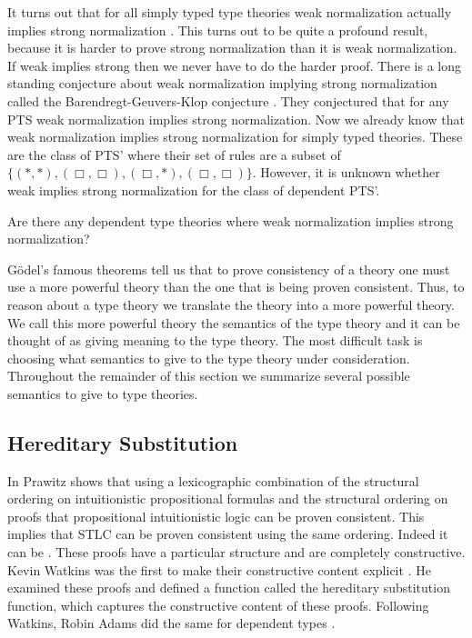 \documentclass{article}
\begin{document}
It turns out that for all simply typed type theories weak
normalization actually implies strong normalization
\cite{Sorensen:1997}.  This turns out to be quite a profound result,
because it is harder to prove strong normalization than it is weak
normalization.  If weak implies strong then we never have to do the
harder proof.  There is a long standing conjecture about weak
normalization implying strong normalization called the
Barendregt-Geuvers-Klop conjecture \cite{Sorensen:2006}.  They
conjectured that for any PTS weak normalization implies strong
normalization.  Now we already know that weak normalization implies
strong normalization for simply typed theories.  These are the class
of PTS' where their set of rules are a subset of
$\{(*,*),(\Box,\Box),(\Box,*),(\Box,\Box)\}$.  However, it is unknown
whether weak implies strong normalization for the class of dependent
PTS'.
\begin{openproblem}
  Are there any dependent type theories where weak normalization
  implies strong normalization?
\end{openproblem}

G\"odel's famous theorems tell us that to prove consistency of a
theory one must use a more powerful theory than the one that is being
proven consistent.  Thus, to reason about a type theory we translate
the theory into a more powerful theory.  We call this more powerful
theory the semantics of the type theory and it can be thought of as
giving meaning to the type theory.  The most difficult task is
choosing what semantics to give to the type theory under
consideration.  Throughout the remainder of this section we summarize
several possible semantics to give to type theories.  

\subsection{Hereditary Substitution}
\label{subsec:hereditary_substitution}
In \cite{Prawitz:1965} Prawitz shows that using a lexicographic
combination of the structural ordering on intuitionistic propositional
formulas and the structural ordering on proofs that propositional
intuitionistic logic can be proven consistent.  This implies that STLC
can be proven consistent using the same ordering.  Indeed it can be
\cite{Girard:1989,Amadio:1998,Levy:1976}.  These
proofs have a particular structure and are completely constructive.
Kevin Watkins was the first to make their constructive content
explicit \cite{Watkins:2004}.  He examined these proofs and defined a
function called the hereditary substitution function, which captures
the constructive content of these proofs.  Following Watkins, Robin
Adams did the same for dependent types \cite{Adams:2004}.
\end{document}
